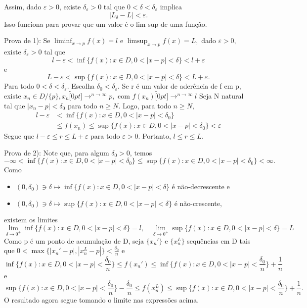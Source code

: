 \documentclass[Analysis/analysis_notes.tex]{subfiles}
\begin{document}
Assim, dado $\varepsilon > 0$, existe $\delta_{\varepsilon}>0$ tal que $0 < \delta < \delta_{\varepsilon}$ implica
$$
	|L_{\delta}-L|< \varepsilon.
$$
Isso funciona para provar que um valor \'e o lim sup de uma fun\c c\~ao.
\begin{proof*}
	Prova de 1): Se $\liminf_{x\to p}f(x) = l$ e $\limsup_{x\to p}f(x) = L,$ dado $\varepsilon > 0,$ existe $\delta_{\varepsilon}>0$
	tal que
	$$
		l - \varepsilon < \inf{\{f(x):x\in D, 0<|x-p|<\delta\}} < l + \varepsilon
	$$
	e
	$$
		L - \varepsilon < \sup{\{f(x):x\in D, 0<|x-p|<\delta\}} < L + \varepsilon.
	$$
	Para todo $0<\delta<\delta_{\varepsilon}.$ Escolha $\delta_{0} < \delta_{\varepsilon}$. Se r \'e um valor de ader\^encia
	de f em p, existe $x_{n}\in D/\{p\}, x_{n}\overbracket[0pt]{\longrightarrow}^{n\to \infty}p,$ com $f(x_{n})\overbracket[0pt]{\longrightarrow}^{n\to \infty}l$
	Seja N natural tal que $|x_{n}-p| < \delta_{0}$ para todo $n\geq{N}.$ Logo, para todo $n\geq{N},$
	\begin{align*}
		l - \varepsilon & < \inf\{f(x):x\in D, 0 < |x-p| < \delta_{0}\}                              \\
		                & \leq{}f(x_{n})\leq{}\sup\{f(x):x\in D, 0 <|x-p|<\delta_{0}\} < \varepsilon
	\end{align*}
	Segue que $l-\varepsilon\leq{r}\leq{L+\varepsilon}$ para todo $\varepsilon > 0$. Portanto, $l\leq{r}\leq{L}.$

	Prova de 2): Note que, para algum $\delta_{0} > 0$, temos
	$$
		-\infty < \inf{\{f(x):x\in D, 0 < |x-p|< \delta_{0}\}}\leq{}\sup\{f(x):x\in D, 0 < |x-p| <\delta_{0}\} < \infty.
	$$
	Como
	\begin{itemize}
		\item $(0, \delta_{0})\ni\delta\mapsto\inf\{f(x):x\in D, 0<|x-p|<\delta\}$ \'e n\~ao-decrescente e
		\item $(0, \delta_{0})\ni\delta\mapsto\sup\{f(x):x\in D, 0<|x-p|<\delta\}$ \'e n\~ao-crescente,
	\end{itemize}
	existem os limites
	$$
		\lim_{\delta\to 0^{+}}\inf\{f(x):x\in D, 0 < |x-p| < \delta\} = l, \quad\lim_{\delta\to 0^{+}}\sup\{f(x):x\in D, 0 < |x-p| < \delta\} = L
	$$
	Como p \'e um ponto de acumula\c c\~ao de D, seja $\{x_{n}'\}$ e $\{x_{n}^{L}\}$ sequ\^encias em D tais que $0<\max\{|x_{n}'-p|, |x_{n}^{L}-p|\}<\frac{\delta_{0}}{n}$
	e
	$$
		\inf{\{f(x):x\in D, 0 < |x-p| < \frac{\delta_{0}}{n}\}}\leq{f(x_{n}')}\leq{}\inf{\{f(x):x \in D, 0 <|x-p|<\frac{\delta_{0}}{n}\}} + \frac{1}{n}
	$$
	e
	$$
		\sup{\{f(x):x\in D, 0 < |x-p| < \frac{\delta_{0}}{n}\}}-\frac{\delta_{0}}{n}\leq{f(x_{n}^{L})}\leq{}\sup{\{f(x):x \in D, 0 <|x-p|<\frac{\delta_{0}}{n}\}} + \frac{1}{n}.
	$$
	O resultado agora segue tomando o limite nas express\~oes acima.


\end{proof*}
\end{document}
